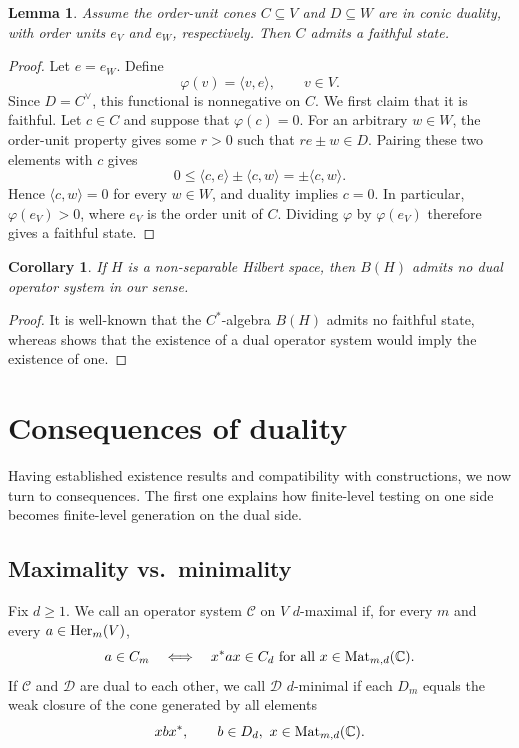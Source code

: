 \documentclass[11pt,onecolumn]{article}
\theoremstyle{plain}
\newtheorem{corollary}[corollary]{Corollary}
\newtheorem{lemma}[lemma]{Lemma}
\theoremstyle{definition}
\begin{document}
\begin{lemma}
\label{lem:state}
    Assume the order-unit cones $C\subseteq V$ and $D\subseteq W$ are in
    conic duality, with order units $e_V$ and $e_W$, respectively. Then $C$
    admits a faithful state.
\end{lemma}
\begin{proof}
    Let $e=e_W$. Define
    \[
        \varphi(v)=\langle v,e\rangle,
        \qquad v\in V.
    \]
    Since $D=C^\vee$, this functional is nonnegative on $C$. We first claim
    that it is faithful. Let $c\in C$ and suppose that $\varphi(c)=0$. For an
    arbitrary $w\in W$, the order-unit property gives some $r>0$ such that
    $re\pm w\in D$.  Pairing these two elements with $c$
    gives
    \[
        0\leqslant \langle c,e\rangle\pm\langle c,w\rangle=\pm\langle c,w\rangle.
    \]
    Hence $\langle c,w\rangle=0$ for
    every $w\in W$, and duality implies $c=0$. In particular,
    $\varphi(e_V)>0$, where $e_V$ is the order unit of $C$. Dividing
    $\varphi$ by $\varphi(e_V)$ therefore gives a faithful state.
\end{proof}

\begin{corollary}
    If $H$ is a non-separable Hilbert space, then $B(H)$ admits no dual
    operator system in our sense.
\end{corollary}
\begin{proof}
    It is well-known that the $C^*$-algebra $B(H)$ admits no faithful state, whereas
     shows that the existence of a dual operator system would
    imply the existence of one.
\end{proof}

\section{Consequences of duality}

Having established existence results and compatibility with constructions, we now turn to consequences.  The first one explains how finite-level testing on one side becomes finite-level generation on the dual side.

\subsection{Maximality vs.\ minimality}

Fix $d\geqslant 1$.  We call an operator system $\mathcal C$ on $V$
$d$-maximal if, for every $m$ and every $a\in{\rm Her}_m(V)$,
\[
    a\in C_m
    \quad\Longleftrightarrow\quad
    x^*ax\in C_d \mbox{ for all }x\in{\rm Mat}_{m,d}(\mathbb C).
\]
If $\mathcal C$ and $\mathcal D$ are dual to each other, we call
$\mathcal D$ $d$-minimal if each $D_m$ equals the weak closure of the cone
generated by all elements
\[
    xbx^*,
    \qquad b\in D_d,\ x\in{\rm Mat}_{m,d}(\mathbb C).
\]
\end{document}

